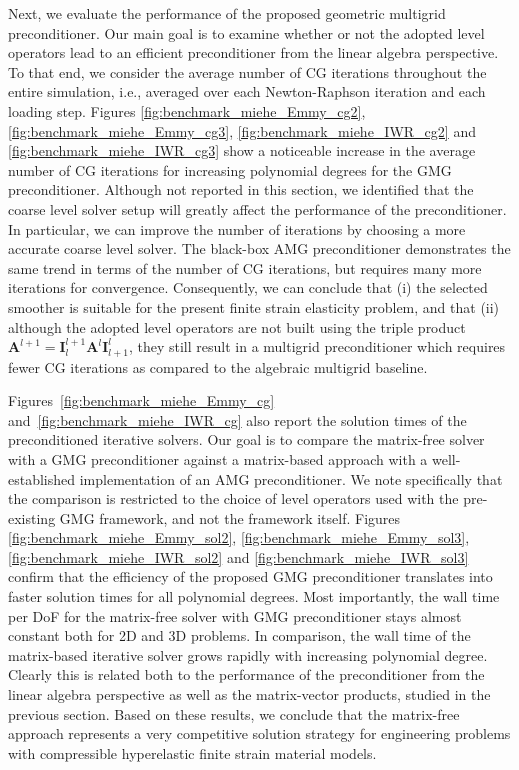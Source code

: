 \documentclass[AMA,STIX1COL]{WileyNJD-v2}
\newcommand*{\gz}[1]{\boldsymbol{#1}}
\begin{document}
Next, we evaluate the performance of the proposed geometric multigrid preconditioner.
Our main goal is to examine whether or not the adopted level operators lead to an efficient preconditioner from the linear algebra perspective. To that end,
we consider the average number of CG iterations throughout the entire simulation, i.e., averaged over each Newton-Raphson iteration and each loading step.
Figures \ref{fig:benchmark_miehe_Emmy_cg2}, \ref{fig:benchmark_miehe_Emmy_cg3}, \ref{fig:benchmark_miehe_IWR_cg2} and \ref{fig:benchmark_miehe_IWR_cg3} show a
 noticeable increase in the average number of CG iterations for increasing polynomial degrees
 for the GMG preconditioner.
Although not reported in this section, we identified that
the coarse level solver setup will greatly affect the performance of the preconditioner.
In particular, we can improve the number of iterations by choosing a more accurate coarse level solver.
The black-box AMG preconditioner
demonstrates the same trend in terms of the number of CG iterations, but
requires many more iterations for convergence.
Consequently, we can conclude that (i) the selected smoother is suitable for the present finite strain elasticity problem, and that (ii) although the adopted level operators are not built using the triple product $\gz A^{l+1}=\gz I^{l+1}_{l} \gz A^l \gz I^l_{l+1}$, they still result in a multigrid preconditioner which requires fewer CG iterations as compared to the algebraic multigrid baseline.

Figures~\ref{fig:benchmark_miehe_Emmy_cg} and~\ref{fig:benchmark_miehe_IWR_cg} also report the solution times of the preconditioned iterative solvers.
Our goal is to compare the matrix-free solver with a GMG preconditioner against a matrix-based approach with a well-established implementation of an AMG preconditioner.
We note specifically that the comparison is restricted to the choice of level operators used with the pre-existing GMG framework, and not the framework itself.
Figures \ref{fig:benchmark_miehe_Emmy_sol2}, \ref{fig:benchmark_miehe_Emmy_sol3}, \ref{fig:benchmark_miehe_IWR_sol2} and \ref{fig:benchmark_miehe_IWR_sol3} confirm that the efficiency of the proposed GMG preconditioner translates into faster solution times for all polynomial degrees.
Most importantly, the wall time per DoF for the matrix-free solver with GMG preconditioner stays almost constant both for 2D and 3D problems.
In comparison, the wall time of the matrix-based iterative solver grows rapidly with increasing polynomial degree.
Clearly this is related both to the performance of the preconditioner from the linear algebra perspective as well as the matrix-vector products, studied in the previous section.
Based on these results, we conclude that the matrix-free approach represents a very competitive solution strategy for engineering problems
with compressible hyperelastic finite strain material models.
\end{document}
